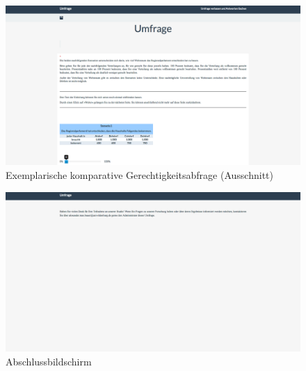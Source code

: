 \documentclass[a4paper]{thesis}
\begin{document}
\begin{figure}[H]
\centering
\includegraphics[width=1\textwidth]{figures/lime_14.png}
\caption[Exemplarische komparative Gerechtigkeitsabfrage (Ausschnitt)]{Exemplarische komparative Gerechtigkeitsabfrage (Ausschnitt)}
\end{figure}

\begin{figure}[H]
\centering
\includegraphics[width=1\textwidth]{figures/lime_15.png}
\caption[Abschlussbildschirm]{Abschlussbildschirm}
\end{figure}
\end{document}
